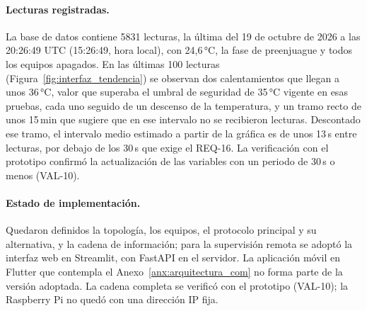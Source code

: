 \paragraph{Lecturas registradas.} La base de datos contiene 5831 lecturas, la última del 19 de octubre de 2026 a las 20:26:49 UTC (15:26:49, hora local), con 24,6\,°C, la fase de preenjuague y todos los equipos apagados. En las últimas 100 lecturas (Figura~\ref{fig:interfaz_tendencia}) se observan dos calentamientos que llegan a unos 36\,°C, valor que superaba el umbral de seguridad de 35\,°C vigente en esas pruebas, cada uno seguido de un descenso de la temperatura, y un tramo recto de unos 15\,min que sugiere que en ese intervalo no se recibieron lecturas. Descontado ese tramo, el intervalo medio estimado a partir de la gráfica es de unos 13\,s entre lecturas, por debajo de los 30\,s que exige el REQ-16. La verificación con el prototipo confirmó la actualización de las variables con un periodo de 30\,s o menos (VAL-10).

\paragraph{Estado de implementación.} Quedaron definidos la topología, los equipos, el protocolo principal y su alternativa, y la cadena de información; para la supervisión remota se adoptó la interfaz web en Streamlit, con FastAPI en el servidor. La aplicación móvil en Flutter que contempla el Anexo~\ref{anx:arquitectura_com} no forma parte de la versión adoptada. La cadena completa se verificó con el prototipo (VAL-10); la Raspberry Pi no quedó con una dirección IP fija.

